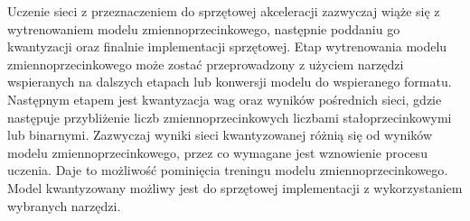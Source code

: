 Uczenie sieci z przeznaczeniem do sprzętowej akceleracji zazwyczaj wiąże się z wytrenowaniem modelu zmiennoprzecinkowego, następnie poddaniu go kwantyzacji oraz finalnie implementacji sprzętowej.
Etap wytrenowania modelu zmiennoprzecinkowego może zostać przeprowadzony z użyciem narzędzi wspieranych na dalszych etapach lub konwersji modelu do wspieranego formatu. 
Następnym etapem jest kwantyzacja wag oraz wyników pośrednich sieci, gdzie następuje przybliżenie liczb zmiennoprzecinkowych liczbami stałoprzecinkowymi lub binarnymi. 
Zazwyczaj wyniki sieci kwantyzowanej różnią się od wyników modelu zmiennoprzecinkowego, przez co wymagane jest wznowienie procesu uczenia.
Daje to możliwość pominięcia treningu modelu zmiennoprzecinkowego.
Model kwantyzowany możliwy jest do sprzętowej implementacji z wykorzystaniem wybranych narzędzi.

